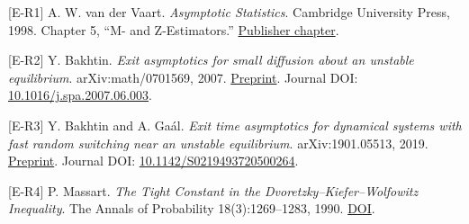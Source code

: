 {[}E-R1{]} A. W. van der Vaart. \emph{Asymptotic Statistics}. Cambridge
University Press, 1998. Chapter 5, ``M- and Z-Estimators.''
\href{https://doi.org/10.1017/CBO9780511802256.006}{Publisher chapter}.

{[}E-R2{]} Y. Bakhtin. \emph{Exit asymptotics for small diffusion about
an unstable equilibrium}. arXiv:math/0701569, 2007.
\href{https://arxiv.org/abs/math/0701569}{Preprint}. Journal DOI:
\href{https://doi.org/10.1016/j.spa.2007.06.003}{10.1016/j.spa.2007.06.003}.

{[}E-R3{]} Y. Bakhtin and A. Gaál. \emph{Exit time asymptotics for
dynamical systems with fast random switching near an unstable
equilibrium}. arXiv:1901.05513, 2019.
\href{https://arxiv.org/abs/1901.05513}{Preprint}. Journal DOI:
\href{https://doi.org/10.1142/S0219493720500264}{10.1142/S0219493720500264}.

{[}E-R4{]} P. Massart. \emph{The Tight Constant in the
Dvoretzky--Kiefer--Wolfowitz Inequality}. The Annals of Probability
18(3):1269--1283, 1990.
\href{https://doi.org/10.1214/aop/1176990746}{DOI}.

